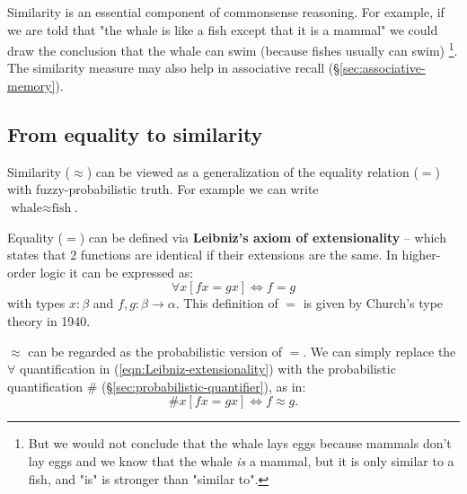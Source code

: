Similarity is an essential component of commonsense reasoning.  For example, if we are told that "the whale is like a fish except that it is a mammal" we could draw the conclusion that the whale can swim (because fishes usually can swim) \footnote{But we would not conclude that the whale lays eggs because mammals don't lay eggs and we know that the whale \emph{is} a mammal, but it is only similar to a fish, and "is" is stronger than "similar to".}.  The similarity measure may also help in associative recall (\S\ref{sec:associative-memory}).

\subsection{From equality to similarity}

 Similarity ($\approx$) can be viewed as a generalization of the equality relation ($=$) with fuzzy-probabilistic truth.  For example we can write\\
\tab $\mbox{whale} \approx \mbox{fish}$.

Equality ($=$) can be defined via \textbf{Leibniz's axiom of extensionality} -- which states that 2 functions are identical if their extensions are the same.  In higher-order logic it can be expressed as:
\begin{equation}
\forall x [f x = g x]  \Leftrightarrow f = g
\label{eqn:Leibniz-extensionality}
\end{equation}
with types $x : \beta$ and $f, g : \beta \rightarrow \alpha $.  This definition of $=$ is given by Church's type theory in 1940.  

$\approx$ can be regarded as the probabilistic version of $=$.  We can simply replace the $\forall$ quantification in (\ref{eqn:Leibniz-extensionality}) with the probabilistic quantification $\#$ (\S\ref{sec:probabilistic-quantifier}), as in:
\begin{equation}
\# x [f x = g x] \Leftrightarrow f \approx g.
\label{eqn:probabilistic-extensionality}
\end{equation}



